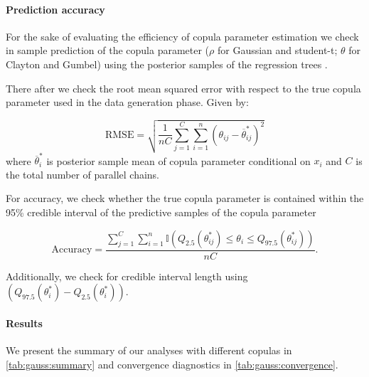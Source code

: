 \documentclass{amsart}
\begin{document}
\paragraph{Prediction accuracy} For the sake of evaluating the efficiency of copula parameter estimation we check in sample prediction of the copula parameter ($\rho$ for Gaussian and student-t; $\theta$ for Clayton and Gumbel) using the posterior samples of the regression trees . 

There after we check the root mean squared error with respect to the true copula parameter used in the data generation phase. Given by:

\begin{equation}
	\text{RMSE} = \sqrt{\frac{1}{nC}\sum_{j=1}^C \sum_{i=1}^n (\theta_{ij} - \overline{\theta}^*_{ij})^2}
\end{equation}
where $\overline{\theta}^*_i$ is posterior sample mean of copula parameter conditional on $x_i$ and $C$ is the total number of parallel chains.

For accuracy, we check whether the true copula parameter is contained within the 95\% credible interval of the predictive samples of the copula parameter

\begin{equation}
	\text{Accuracy} = \frac{\sum_{j=1}^C\sum_{i=1}^n\mathbb{I}\left(Q_{2.5}(\theta^*_{ij}) \le \theta_i \le Q_{97.5}(\theta^*_{ij})\right)}{nC}.
\end{equation}

Additionally, we check for credible interval length using $\left(Q_{97.5}(\theta^*_i) - Q_{2.5}(\theta^*_i)\right)$.

\paragraph{Results}

We present the summary of our analyses with different copulas in \cref{tab:gauss:summary} and convergence diagnostics in \cref{tab:gauss:convergence}.
\end{document}
